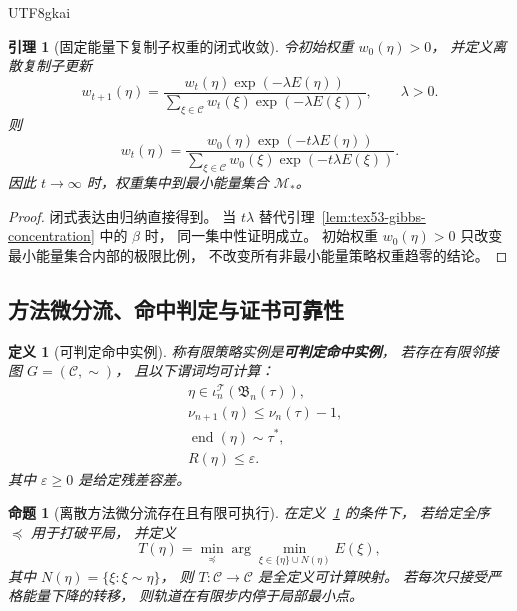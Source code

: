\documentclass[12pt]{article}
\newtheorem{definition}{定义}[section]
\newtheorem{proposition}{命题}[section]
\newtheorem{lemma}{引理}[section]
\newcommand{\Endp}{\operatorname{end}}
\begin{document}
\begin{CJK*}{UTF8}{gkai}
\begin{lemma}[固定能量下复制子权重的闭式收敛]
\label{lem:tex53-replicator-convergence}
令初始权重 \(w_0(\eta)>0\)，
并定义离散复制子更新
\[
  w_{t+1}(\eta)
  =
  \frac{w_t(\eta)\exp(-\lambda E(\eta))}
       {\sum_{\xi\in\mathcal C}w_t(\xi)\exp(-\lambda E(\xi))},
  \qquad \lambda>0.
\]
则
\[
  w_t(\eta)
  =
  \frac{w_0(\eta)\exp(-t\lambda E(\eta))}
       {\sum_{\xi\in\mathcal C}w_0(\xi)\exp(-t\lambda E(\xi))}.
\]
因此 \(t\to\infty\) 时，权重集中到最小能量集合 \(\mathcal M_\ast\)。
\end{lemma}

\begin{proof}
闭式表达由归纳直接得到。
当 \(t\lambda\) 替代引理~\ref{lem:tex53-gibbs-concentration} 中的 \(\beta\) 时，
同一集中性证明成立。
初始权重 \(w_0(\eta)>0\) 只改变最小能量集合内部的极限比例，
不改变所有非最小能量策略权重趋零的结论。
\end{proof}

\subsection{方法微分流、命中判定与证书可靠性}
\label{subsec:tex53-hit-cert-closure}

\begin{definition}[可判定命中实例]
\label{def:tex53-decidable-hit-instance}
称有限策略实例是\textbf{可判定命中实例}，
若存在有限邻接图 \(G=(\mathcal C,\sim)\)，
且以下谓词均可计算：
\[
\begin{aligned}
  &\eta\in\iota_n^{\mathcal T}(\mathfrak B_n(\tau)),\\
  &\nu_{n+1}(\eta)\le\nu_n(\tau)-1,\\
  &\Endp(\eta)\sim\tau^\ast,\\
  &R(\eta)\le\varepsilon.
\end{aligned}
\]
其中 \(\varepsilon\ge0\) 是给定残差容差。
\end{definition}

\begin{proposition}[离散方法微分流存在且有限可执行]
\label{prop:tex53-discrete-flow-existence}
在定义~\ref{def:tex53-decidable-hit-instance} 的条件下，
若给定全序 \(\preceq\) 用于打破平局，
并定义
\[
  T(\eta)
  =
  \min_{\preceq}
  \arg\min_{\xi\in\{\eta\}\cup N(\eta)}E(\xi),
\]
其中 \(N(\eta)=\{\xi:\xi\sim\eta\}\)，
则 \(T:\mathcal C\to\mathcal C\) 是全定义可计算映射。
若每次只接受严格能量下降的转移，
则轨道在有限步内停于局部最小点。
\end{proposition}


\end{CJK*}
\end{document}
